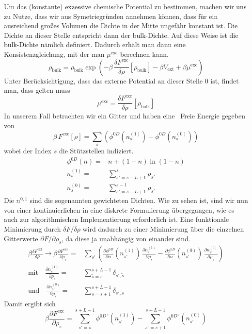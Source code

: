 \documentclass[12pt]{article}
\begin{document}
Um das (konstante) exzessive chemische Potential zu bestimmen, machen wir uns zu Nutze, dass wir aus Symetriegründen annehmen können, dass für ein ausreichend großes Volumen die Dichte in der Mitte ungefähr konstant ist. Die Dichte an dieser Stelle entspricht dann der bulk-Dichte. Auf diese Weise ist die bulk-Dichte nämlich definiert. Dadurch erhält man dann eine Konsistenzgleichung, mit der man $\mu^\text{exc}$ berechnen kann.
$$\rho_\text{bulk}=\rho_\text{bulk}\exp\left(-\beta\,\frac{\delta{F^\text{exc}}}{\delta\rho}[\rho_\text{bulk}]-\beta{V_\text{ext}+\beta\mu^\text{exc}}\right)$$
Unter Berücksichtigung, dass das externe Potential an dieser Stelle 0 ist, findet man, dass gelten muss
$$\mu^\text{exc}=\frac{\delta{F}^\text{exc}}{\delta\rho}[\rho_\text{bulk}]$$
In unserem Fall betrachten wir ein Gitter und haben eine \grqq\, Freie Energie gegeben von
$$\beta\,F^\text{exc}[\rho]=\sum_{s}(\phi^{0D}(n^{(1)}_s)-\phi^{0D}(n^{(0)}_s))$$
wobei der Index $s$ die Stützstellen indiziert.
\begin{align*}\phi^{0D}(n)=&n+(1-n)\ln(1-n)\\
n^{(1)}_s=&\sum_{s'=s-L+1}^s\rho_{s'}\\
n^{(0)}_s=&\sum_{s'=s-L+1}^{s-1}\rho_{s'}\end{align*}
Die $n^{0,1}$ sind die sogenannten gewichteten Dichten. Wie zu sehen ist, sind wir nun von einer kontinuierlichen in eine diskrete Formulierung übergegangen, wie es auch zur algorithmischen Implementierung erforderlich ist. Eine funktionale Minimierung durch $\delta{F}/\delta\rho$ wird dadurch zu einer Minimierung über die einzelnen Gitterwerte $\partial{F}/\partial\rho_s$, da diese ja unabhängig von einander sind.
\begin{align*}\beta\frac{\delta{F^\text{ext}}}{\delta\rho}\rightarrow\beta\frac{\partial{F^\text{exc}}}{\partial\rho_s}
=&\sum_{s'}(\frac{\partial\phi^{0D}}{\partial{n}}(n^{(1)}_{s'})\,\frac{\partial{n^{(1)}_{s'}}}{\partial\rho_s}-\frac{\partial\phi^{0D}}{\partial{n}}(n^{(0)}_{s'})\,\frac{\partial{n^{(0)}_{s'}}}{\partial\rho_s})\\
\text{mit}\quad\frac{\partial{n^{(1)}_{s'}}}{\partial\rho_s}=&\sum_{\tilde{s}=s}^{s+L-1}\delta_{s',\tilde{s}}\\
\text{und}\quad\frac{\partial{n^{(0)}_{s'}}}{\partial\rho_s}=&\sum_{\tilde{s}=s+1}^{s+L-1}\delta_{s',\tilde{s}}\end{align*}
Damit ergibt sich
$$\beta\frac{\partial{F^\text{exc}}}{\partial\rho_s}=\sum_{s'=s}^{s+L-1}\phi^{0D\,'}(n^{(1)}_{s'})-\sum_{s'=s+1}^{s+L-1}\phi^{0D\,'}(n^{(0)}_{s'})$$
\end{document}
